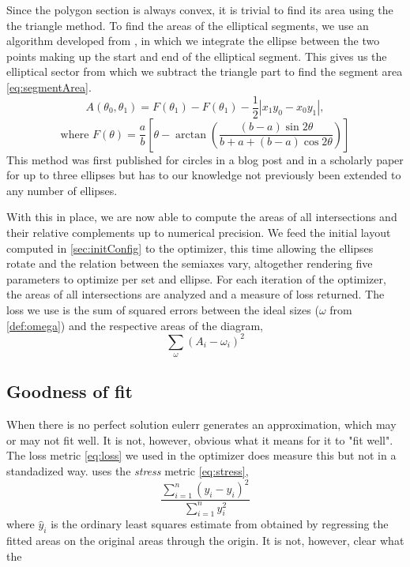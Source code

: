 \documentclass[a4paper,nofonts,nobib,titlepage,justified,marginals=raggedouter,nohyper]{tufte-handout}\usepackage[]{graphicx}\usepackage[]{color}
\newcommand{\pkg}[1]{{\fontseries{b}\selectfont #1}}
\begin{document}
Since the polygon section is always convex, it is trivial to find its area using
the the triangle method. To find the areas of the elliptical segments, we use
an algorithm developed from \citet{eberly_area_2016}, in which we
integrate the ellipse between the two points making up the start and end of
the elliptical segment. This gives us the elliptical sector from which we
subtract the triangle part to find the segment area \eqref{eq:segmentArea}.
\begin{equation}
A(\theta_0, \theta_1) = F(\theta_1) - F(\theta_1) -
\frac{1}{2}|x_1y_0 - x_0y_1|,
\label{eq:segmentArea}
\end{equation}
\[
\text{where } F(\theta) = \frac{a}{b}\left[ \theta -
\arctan{\left(\frac{(b - a)\sin{2\theta}}{b + a +(b - a )\cos{2\theta}} \right)}
\right]
\]
This method was first published for circles in a blog post
\citep{frederickson_2013} and in a scholarly paper for up to three ellipses
\citep{micaleff_2013} but has to
our knowledge not previously been extended to any number of ellipses.

With this in place, we are now able to compute the areas of all
intersections and their relative complements up to numerical precision.
We feed the initial layout computed in \cref{sec:initConfig}
to the optimizer, this time allowing the ellipses rotate and the relation
between the semiaxes vary, altogether rendering five parameters to optimize per
set and ellipse. For each iteration of the
optimizer, the areas of all intersections are analyzed and a measure of
loss returned. The loss we use is the sum of squared errors
between the ideal sizes ($\omega$ from \cref{def:omega}) and
the respective areas of the diagram,
\begin{equation}
\sum_\omega  (A_i-\omega_i)^2
\label{eq:loss}
\end{equation}

\subsection{Goodness of fit}

When there is no perfect solution \pkg{eulerr} generates
an approximation, which may or may not fit well. It is not, however, obvious
what it means for it to "fit well". The loss metric \eqref{eq:loss} we used in
the optimizer does measure this but not in a standadized way.
\citet{wilkinson_2012} uses the \emph{stress} metric \eqref{eq:stress},
\begin{equation}
\frac{\sum_{i=1}^n (y_i - \hat{y}_i) ^ 2}{\sum_{i=1}^n y_i^2}
\label{eq:stress}
\end{equation}
where $\hat{y}_i$ is the ordinary least squares estimate from obtained by
regressing the fitted areas on the original areas through the
origin. It is not, however, clear what the
\end{document}
